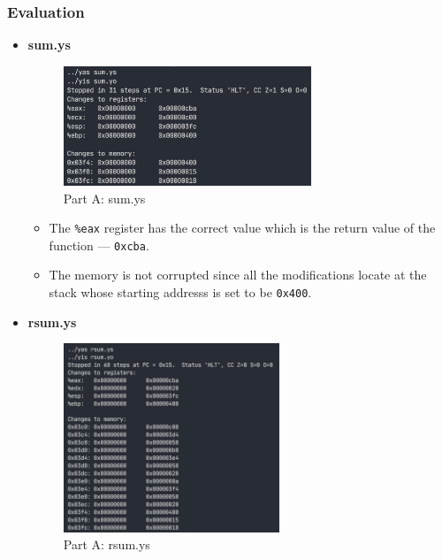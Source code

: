 \documentclass[12pt,a4paper]{article}
\begin{document}
\subsubsection{Evaluation}
\begin{itemize}
	\item \textbf{sum.ys}\\

\begin{figure}[H] %
        \centering %
        \includegraphics[width=0.7\textwidth]{partA-sum-bz.png} %
        \caption{Part A: sum.ys} %
        \label{Fig.partA-sum} %
\end{figure}
\begin{itemize}
        \item The \texttt{\%eax} register has the correct value which is the return value of the function --- \texttt{0xcba}.
        \item The memory is not corrupted since all the modifications locate at the stack whose starting addresss is set to be \texttt{0x400}.
\end{itemize}
	\item \textbf{rsum.ys}\\

\begin{figure}[H] %
        \centering %
        \includegraphics[width=0.61\textwidth]{partA-rsum-bz.png} %
        \caption{Part A: rsum.ys} %
        \label{Fig.partA-rsum} %
\end{figure}


\end{itemize}
\end{document}
